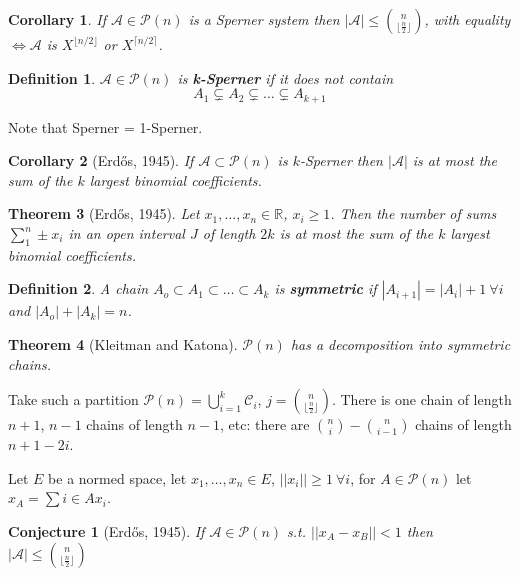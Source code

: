 \documentclass[a4paper]{article}
\newtheorem*{definition}{Definition}
\newtheorem*{conjecture}{Conjecture}
\newtheorem{theorem}{Theorem}
\newtheorem{corollary}[theorem]{Corollary}
\newcommand*\abs[1]{\left|#1\right|}
\newcommand*\norm[1]{\abs{\abs{#1}}}
\begin{document}
\begin{corollary}
	If $\mathcal{A} \in \mathcal{P}(n)$ is a Sperner system then $\abs{\mathcal{A}} \leq {n \choose {\lfloor \frac{n}{2} \rfloor}}$, with equality $\iff \mathcal{A}$ is $X^{\lfloor n/2 \rfloor}$ or $X^{\lceil n/2 \rceil}$.
\end{corollary}

\begin{definition}
	$\mathcal{A} \in \mathcal{P}(n)$ is \textbf{k-Sperner} if it does not contain $$A_1 \subsetneq A_2 \subsetneq \dots \subsetneq A_{k+1}$$
\end{definition}

Note that Sperner = 1-Sperner.

\begin{corollary}[Erd\H{o}s, 1945]
If $\mathcal{A} \subset \mathcal{P}(n)$ is $k$-Sperner then $\abs{\mathcal{A}}$ is at most the sum of the $k$ largest binomial coefficients.	
\end{corollary}

\begin{theorem}[Erd\H{o}s, 1945]
	Let $x_1, \dots, x_n \in \mathbb{R}$, $x_i \geq 1$.
	Then the number of sums $\sum_1^n \pm x_i$ in an open interval $J$ of length $2k$ is at most the sum of the $k$ largest binomial coefficients.
\end{theorem}

\begin{definition}
	A chain $A_o \subset A_1 \subset \dots \subset A_k$ is \textbf{symmetric} if $\abs{A_{i+1}} = \abs{A_i} + 1\ \forall i$ and $\abs{A_o} + \abs{A_k} = n$.
\end{definition}

\begin{theorem}[Kleitman and Katona]
	$\mathcal{P}(n)$ has a decomposition into symmetric chains.
\end{theorem}

Take such a partition $\mathcal{P}(n) = \bigcup_{i=1}^k \mathcal{C}_i$, $j = {n \choose {\lfloor\frac{n}{2}\rfloor}}$.
There is one chain of length $n+1$, $n-1$ chains of length $n-1$, etc:
there are ${n \choose i} - {n \choose {i-1}}$ chains of length $n+1-2i$.

Let $E$ be a normed space, let $x_1, \dots, x_n \in E$, $\norm{x_i} \geq 1 \ \forall i$, for $A \in \mathcal{P}(n)$ let $x_A = \sum{i \in A} x_i$.
\begin{conjecture}[Erd\H{o}s, 1945]
	If $\mathcal{A} \in \mathcal{P}(n)$ s.t. $\norm{x_A - x_B} < 1$ then $\abs{\mathcal{A}} \leq {n \choose {\lfloor\frac{n}{2}\rfloor}}$
\end{conjecture}
\end{document}
